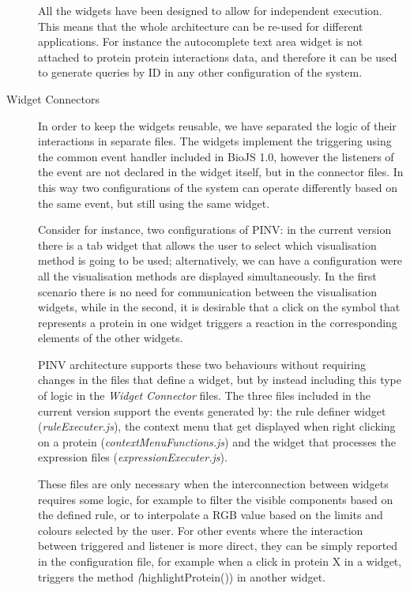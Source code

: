 \begin{description}
All the widgets have been designed to allow for independent execution. This means that the whole architecture can be re-used for different applications. For instance the autocomplete text area widget is not attached to protein protein interactions data, and therefore it can be used to generate queries by ID in any other configuration of the system.

\item[Widget Connectors]
In order to keep the widgets reusable, we have separated the logic of their interactions in separate files. The widgets implement the triggering using the common event handler included in BioJS 1.0, however the listeners of the event are not declared in the widget itself, but in the connector files. In this way two configurations of the system can operate differently based on the same event, but still using the same widget. 

Consider for instance, two configurations of PINV: in the current version there is a tab widget that allows the user to select which visualisation method is going to be used; alternatively, we can have a configuration were all the visualisation methods are displayed simultaneously. In the first scenario there is no need for communication between the visualisation widgets, while in the second, it is desirable that a click on the symbol that represents a protein in one widget triggers a reaction in the corresponding elements of the other widgets. 

PINV architecture supports these two behaviours without requiring changes in the files that define a widget, but by instead including this type of logic in the \emph{Widget Connector} files. The three files included in the current version support the events generated by: the rule definer widget (\emph{ruleExecuter.js}), the context menu that get displayed when right clicking on a protein (\emph{contextMenuFunctions.js}) and the widget that processes the expression files  (\emph{expressionExecuter.js}).

These files are only necessary when the interconnection between widgets requires some logic, for example to filter the visible components based on the defined rule, or to interpolate a RGB value based on the limits and colours selected by the user. For other events where the interaction between triggered and listener is more direct, they can be simply reported in the configuration file, for example when a click in protein X in a widget, triggers the method \emph(highlightProtein()) in another widget.


\end{description}
